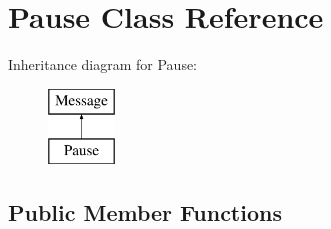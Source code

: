 \hypertarget{class_pause}{\section{Pause Class Reference}
\label{class_pause}
}
Inheritance diagram for Pause\-:\begin{figure}[H]
\begin{center}
\leavevmode
\includegraphics[height=2.000000cm]{class_pause}
\end{center}
\end{figure}
\subsection*{Public Member Functions}
